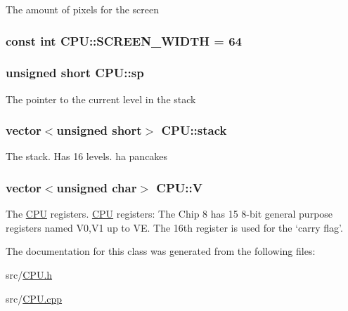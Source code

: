 The amount of pixels for the screen \hypertarget{classCPU_a8feada83f7887e1a418c4dd308fbd4a9}{
\subsubsection[{S\-C\-R\-E\-E\-N\-\_\-\-W\-I\-D\-T\-H}]{\setlength{\rightskip}{0pt plus 5cm}const int C\-P\-U\-::\-S\-C\-R\-E\-E\-N\-\_\-\-W\-I\-D\-T\-H = 64\hspace{0.3cm}{\ttfamily [static]}}}\label{classCPU_a8feada83f7887e1a418c4dd308fbd4a9}
\hypertarget{classCPU_a4d0854788d689d0f4ee604f3001b1732}{
\subsubsection[{sp}]{\setlength{\rightskip}{0pt plus 5cm}unsigned short C\-P\-U\-::sp\hspace{0.3cm}{\ttfamily [private]}}}\label{classCPU_a4d0854788d689d0f4ee604f3001b1732}
The pointer to the current level in the stack \hypertarget{classCPU_a89db51ac963d4badd4c9c7a701f1edea}{
\subsubsection[{stack}]{\setlength{\rightskip}{0pt plus 5cm}vector$<$unsigned short$>$ C\-P\-U\-::stack\hspace{0.3cm}{\ttfamily [private]}}}\label{classCPU_a89db51ac963d4badd4c9c7a701f1edea}
The stack. Has 16 levels. ha pancakes \hypertarget{classCPU_a2fc154eb8eb17dd75c897fc69c48ab31}{
\subsubsection[{V}]{\setlength{\rightskip}{0pt plus 5cm}vector$<$unsigned char$>$ C\-P\-U\-::\-V\hspace{0.3cm}{\ttfamily [private]}}}\label{classCPU_a2fc154eb8eb17dd75c897fc69c48ab31}
The \hyperlink{classCPU}{C\-P\-U} registers. \hyperlink{classCPU}{C\-P\-U} registers\-: The Chip 8 has 15 8-\/bit general purpose registers named V0,V1 up to V\-E. The 16th register is used for the ‘carry flag’. 

The documentation for this class was generated from the following files\-:\begin{DoxyCompactItemize}
\item 
src/\hyperlink{CPU_8h}{C\-P\-U.\-h}\item 
src/\hyperlink{CPU_8cpp}{C\-P\-U.\-cpp}\end{DoxyCompactItemize}
